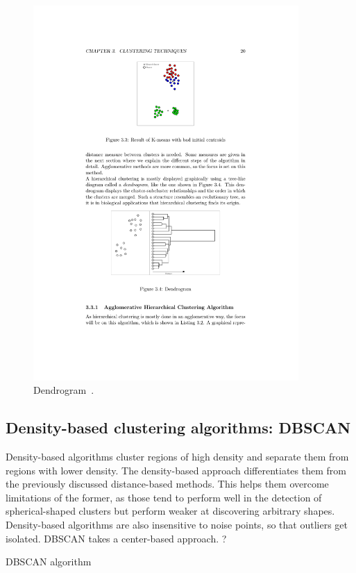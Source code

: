 \begin{figure}[h]
  \begin{center}
    \includegraphics[width=0.9\textwidth]{figures/clustering_hierarchical_dendrogram.pdf}
    \caption{Dendrogram~\cite[p 20]{Meert06clustermaps}.}
    \label{fig:clustering-hierarchical-dendrogram}
  \end{center}
\end{figure}


\subsection{Density-based clustering algorithms: DBSCAN}

Density-based algorithms cluster regions of high density and separate them from regions with lower density. The density-based approach differentiates them from the previously discussed distance-based methods. This helps them overcome limitations of the former, as those tend to perform well in the detection of spherical-shaped clusters but perform weaker at discovering arbitrary shapes. Density-based algorithms are also insensitive to noise points, so that outliers get isolated. DBSCAN takes a center-based approach.
?
\begin{algorithm}[t]
  \caption{DBSCAN algorithm~\cite{Meert06clustermaps}}
  \label{alg:dbscan}
\end{algorithm}

